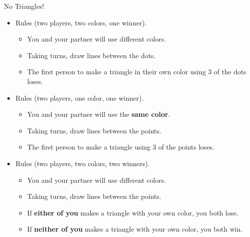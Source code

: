 \documentclass{article}
\begin{document}
    
    \begin{huge} No Triangles! \end{huge}

    \hrulefill

    \bigskip

    \begin{minipage}[b]{.7\textwidth}
        \begin{itemize}
            \item Rules (two players, two colors, one winner).
            \begin{itemize}
                \item You and your partner will use different colors.
                \item Taking turns, draw lines between the dots.
                \item The first person to make a triangle in their own color using 3 of the dots loses.
            \end{itemize}
            \bigskip
            \item Rules (two players, one color, one winner).
            \begin{itemize}
                \item You and your partner will use the \textbf{same color}.
                \item Taking turns, draw lines between the points.
                \item The first person to make a triangle using 3 of the points loses.
            \end{itemize}
            \bigskip
            \item Rules (two players, two colors, two winners).
            \begin{itemize}
                \item You and your partner will use different colors.
                \item Taking turns, draw lines between the points.
                \item If \textbf{either of you} makes a triangle with your own color, you both lose.
                \item If \textbf{neither of you} makes a triangle with your own color, you both win.
            \end{itemize}
        \end{itemize}
    \end{minipage}
    \begin{minipage}[b]{.3\textwidth}
        \scalebox{.9}{
            
        }
    \end{minipage}
\end{document}
